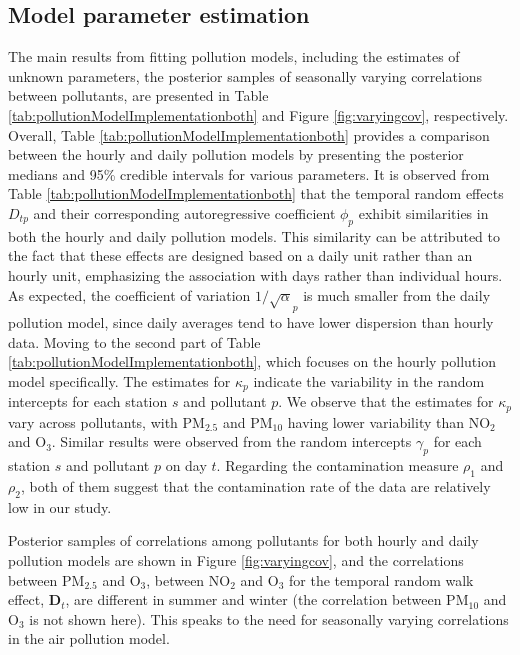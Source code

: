 \documentclass[
  12,
]{article}
\begin{document}
\hypertarget{model-parameter-estimation}{%
\subsection{Model parameter
estimation}\label{model-parameter-estimation}}

The main results from fitting pollution models, including the estimates
of unknown parameters, the posterior samples of seasonally varying
correlations between pollutants, are presented in Table
\ref{tab:pollutionModelImplementationboth} and Figure
\ref{fig:varyingcov}, respectively. Overall, Table
\ref{tab:pollutionModelImplementationboth} provides a comparison between
the hourly and daily pollution models by presenting the posterior
medians and 95\% credible intervals for various parameters. It is
observed from Table \ref{tab:pollutionModelImplementationboth} that the
temporal random effects \(D_{tp}\) and their corresponding
autoregressive coefficient \(\phi_p\) exhibit similarities in both the
hourly and daily pollution models. This similarity can be attributed to
the fact that these effects are designed based on a daily unit rather
than an hourly unit, emphasizing the association with days rather than
individual hours. As expected, the coefficient of variation
\(1/\sqrt\alpha_p\) is much smaller from the daily pollution model,
since daily averages tend to have lower dispersion than hourly data.
Moving to the second part of Table
\ref{tab:pollutionModelImplementationboth}, which focuses on the hourly
pollution model specifically. The estimates for \(\kappa_p\) indicate
the variability in the random intercepts for each station \(s\) and
pollutant \(p\). We observe that the estimates for \(\kappa_p\) vary
across pollutants, with PM\(_{2.5}\) and PM\(_{10}\) having lower
variability than NO\(_2\) and O\(_3\). Similar results were observed
from the random intercepts \(\gamma_p\) for each station \(s\) and
pollutant \(p\) on day \(t\). Regarding the contamination measure
\(\rho_1\) and \(\rho_2\), both of them suggest that the contamination
rate of the data are relatively low in our study.

Posterior samples of correlations among pollutants for both hourly and
daily pollution models are shown in Figure \ref{fig:varyingcov}, and the
correlations between PM\(_{2.5}\) and O\(_3\), between NO\(_2\) and
O\(_3\) for the temporal random walk effect, \(\mathbf{D}_t\), are
different in summer and winter (the correlation between PM\(_{10}\) and
O\(_3\) is not shown here). This speaks to the need for seasonally
varying correlations in the air pollution model.
\end{document}
